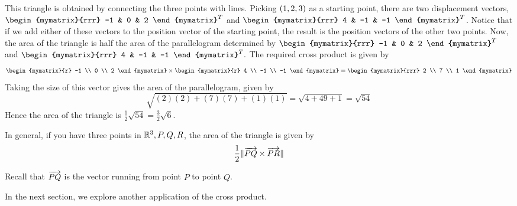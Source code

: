 \begin{solution}
This triangle is obtained by connecting the three points with lines. Picking
$\left(1,2,3\right) $ as a starting point, there are two displacement
vectors, $\begin{mymatrix}{rrr}
-1 & 0 & 2
\end{mymatrix}^T $ and $\begin{mymatrix}{rrr}
4 & -1 & -1
\end{mymatrix}^T $. Notice that if we add either of these vectors to the position vector of the 
starting point, the result is the position vectors of the other two
points. Now, the area of the triangle is half the area of the parallelogram
determined by $\begin{mymatrix}{rrr}
-1 & 0 & 2
\end{mymatrix}^T $ and $\begin{mymatrix}{rrr}
4 & -1 & -1
\end{mymatrix}^T.$ 
The required cross product is given by
\begin{equation*}
\begin{mymatrix}{r}
-1 \\
0 \\
2
\end{mymatrix} \times \begin{mymatrix}{r}
4 \\
-1 \\
-1
\end{mymatrix} = \begin{mymatrix}{rrr}
2 \\ 7 \\ 1
\end{mymatrix} 
\end{equation*}
  Taking the size of this vector gives the area of the parallelogram,
given by 
\begin{equation*}
\sqrt{(2)(2) + (7)(7) + (1)(1)}
=
\sqrt{4+49+1}
= \sqrt{54}
\end{equation*}
Hence the area of the triangle is $\frac{1}{2}\sqrt{54}= \frac{3}{2}\sqrt{6}.$
\end{solution}

In general, if you have three points in $\mathbb{R}^{3}, P,Q,R$, the area of the triangle is given by
\begin{equation*}
\frac{1}{2}\|\overrightarrow{PQ} \times  \overrightarrow{PR}\| 
\end{equation*}

Recall that $\overrightarrow{PQ}$ is the vector running from point $P$ to point $Q$. 

\begin{center}
\end{center}

In the next section, we explore another application of the cross product.